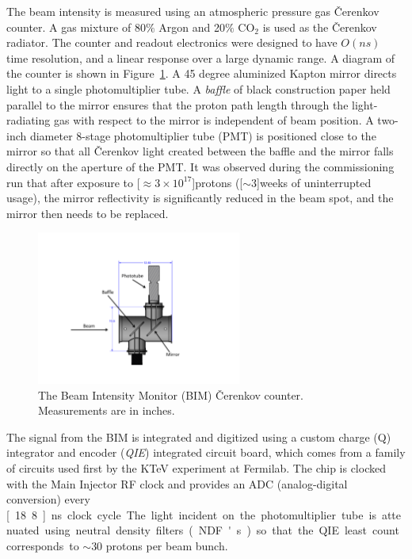 The beam intensity is measured using an atmospheric pressure gas \v{C}erenkov counter. A gas mixture of 80$\%$ Argon and 20$\%$ CO$_2$ is used as the \v{C}erenkov radiator. The counter and readout electronics were designed to have $O(ns)$ time resolution, and a linear response over a large dynamic range.  A diagram of the counter is shown in Figure~\ref{fig:BIMCerenkov}.  A 45 degree aluminized Kapton mirror directs light to a single photomultiplier tube.  A \emph{baffle} of black construction paper held parallel to the mirror ensures that the proton path length through the light-radiating gas with respect to the mirror is independent of beam position. A two-inch diameter 8-stage photomultiplier tube (PMT) is positioned close to the mirror so that all \v{C}erenkov light created between the baffle and the mirror falls directly on the aperture of the PMT. It was observed during the commissioning run that after exposure to \unit[$\approx 3 \times 10^{17}$]{protons} (\unit[$\sim3$]{weeks} of uninterrupted usage), the mirror reflectivity is significantly reduced in the beam spot, and the mirror then needs to be replaced.

\begin{figure}
	\begin{center}
		\includegraphics[width=0.6\textwidth]{figures/apparatus/BIMCerenkov.pdf}
		\caption{The Beam Intensity Monitor (BIM) \v{C}erenkov counter. Measurements are in inches.}
		\label{fig:BIMCerenkov}
	\end{center}
\end{figure}

The signal from the BIM is integrated and digitized using a custom charge (Q) integrator and encoder (\emph{QIE}) integrated circuit board, which comes from a family of circuits used first by the KTeV experiment at Fermilab\cite{QIE}. The chip is clocked with the Main Injector RF clock and provides an ADC (analog-digital conversion) every \unit[18.8]{ns} clock cycle. The light incident on the photomultiplier tube is attenuated using neutral density filters (NDF's) so that the QIE least count corresponds to $\sim$30 protons per beam bunch.

